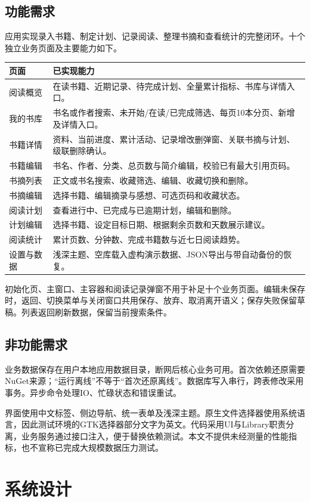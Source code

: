 \documentclass[UTF8,a4paper,11pt,fontset=none]{ctexart}
\begin{document}
\subsection{功能需求}
应用实现录入书籍、制定计划、记录阅读、整理书摘和查看统计的完整闭环。十个独立业务页面及主要能力如下。
\begin{longtable}{p{27mm}p{112mm}}\toprule 页面 & 已实现能力\\\midrule
阅读概览 & 在读书籍、近期记录、待完成计划、全量累计指标、书库与详情入口。\\
我的书库 & 书名或作者搜索、未开始/在读/已完成筛选、每页10本分页、新增及详情入口。\\
书籍详情 & 资料、当前进度、累计活动、记录增改删弹窗、关联书摘与计划、级联删除确认。\\
书籍编辑 & 书名、作者、分类、总页数与简介编辑，校验已有最大引用页码。\\
书摘列表 & 正文或书名搜索、收藏筛选、编辑、收藏切换和删除。\\
书摘编辑 & 选择书籍、编辑摘录与感想、可选页码和收藏状态。\\
阅读计划 & 查看进行中、已完成与已逾期计划，编辑和删除。\\
计划编辑 & 选择书籍、设定目标日期、根据剩余页数和天数展示建议。\\
阅读统计 & 累计页数、分钟数、完成书籍数与近七日阅读趋势。\\
设置与数据 & 浅深主题、空库载入虚构演示数据、JSON导出与带自动备份的恢复。\\\bottomrule
\end{longtable}

初始化页、主窗口、主容器和阅读记录弹窗不用于补足十个业务页面。编辑未保存时，返回、切换菜单与关闭窗口共用保存、放弃、取消离开语义；保存失败保留草稿。列表返回刷新数据，保留当前搜索条件。
\subsection{非功能需求}
业务数据保存在用户本地应用数据目录，断网后核心业务可用。首次依赖还原需要NuGet来源；“运行离线”不等于“首次还原离线”。数据库写入串行，跨表修改采用事务。异步命令处理IO、忙碌状态和错误重试。

界面使用中文标签、侧边导航、统一表单及浅深主题。原生文件选择器使用系统语言，因此测试环境的GTK选择器部分文字为英文。代码采用UI与Library职责分离，业务服务通过接口注入，便于替换依赖测试。本文不提供未经测量的性能指标，也不宣称已完成大规模数据压力测试。
\section{系统设计}
\end{document}
